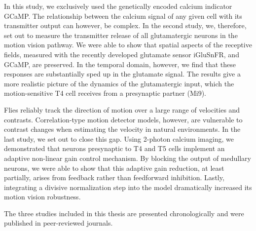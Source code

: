 In this study, we exclusively used the genetically encoded calcium indicator GCaMP. The relationship between the calcium signal of any given cell with its transmitter output can however, be complex. In the second study, we, therefore, set out to measure the transmitter release of all glutamatergic neurons in the motion vision pathway. 
We were able to show that spatial aspects of the receptive fields, measured with the recently developed glutamate sensor iGluSnFR, and GCaMP, are preserved. In the temporal domain, however, we find that these responses are substantially sped up in the glutamate signal. The results give a more realistic picture of the dynamics of the glutamatergic input, which the motion-sensitive T4 cell receives from a presynaptic partner (Mi9).

Flies reliably track the direction of motion over a large range of velocities and contrasts. Correlation-type motion detector models, however, are vulnerable to contrast changes when estimating the velocity in natural environments. In the last study, we set out to close this gap. Using 2-photon calcium imaging, we demonstrated that neurons presynaptic to T4 and T5 cells implement an adaptive non-linear gain control mechanism. By blocking the output of medullary neurons, we were able to show that this adaptive gain reduction, at least partially, arises from feedback rather than feedforward inhibition. Lastly, integrating a divisive normalization step into the model dramatically increased its motion vision robustness. 

The three studies included in this thesis are presented chronologically and were published in peer-reviewed journals. 


% 


\vfill


\endgroup			

\vfill

